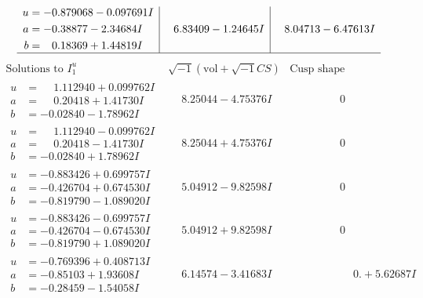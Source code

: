 \documentclass[1p]{elsarticle_modified}
\theoremstyle{definition}
\newcommand{\I}{\sqrt{-1}}
\begin{document}
$$\begin{array}{c|c|c}
\begin{aligned}
u &= -0.879068 - 0.097691 I \\
a &= -0.38877 - 2.34684 I \\
b &= \phantom{-}0.18369 + 1.44819 I\end{aligned}
 & \phantom{-}6.83409 - 1.24645 I & \phantom{-}8.04713 - 6.47613 I\\
 \hline 
 \end{array}$$\newpage$$\begin{array}{c|c|c}  
\text{Solutions to }I^u_{1}& \I (\text{vol} + \sqrt{-1}CS) & \text{Cusp shape}\\
 \hline 
\begin{aligned}
u &= \phantom{-}1.112940 + 0.099762 I \\
a &= \phantom{-}0.20418 + 1.41730 I \\
b &= -0.02840 - 1.78962 I\end{aligned}
 & \phantom{-}8.25044 - 4.75376 I & \phantom{-0.000000 } 0 \\ \hline\begin{aligned}
u &= \phantom{-}1.112940 - 0.099762 I \\
a &= \phantom{-}0.20418 - 1.41730 I \\
b &= -0.02840 + 1.78962 I\end{aligned}
 & \phantom{-}8.25044 + 4.75376 I & \phantom{-0.000000 } 0 \\ \hline\begin{aligned}
u &= -0.883426 + 0.699757 I \\
a &= -0.426704 + 0.674530 I \\
b &= -0.819790 - 1.089020 I\end{aligned}
 & \phantom{-}5.04912 - 9.82598 I & \phantom{-0.000000 } 0 \\ \hline\begin{aligned}
u &= -0.883426 - 0.699757 I \\
a &= -0.426704 - 0.674530 I \\
b &= -0.819790 + 1.089020 I\end{aligned}
 & \phantom{-}5.04912 + 9.82598 I & \phantom{-0.000000 } 0 \\ \hline\begin{aligned}
u &= -0.769396 + 0.408713 I \\
a &= -0.85103 + 1.93608 I \\
b &= -0.28459 - 1.54058 I\end{aligned}
 & \phantom{-}6.14574 - 3.41683 I & \phantom{-0.000000 -}0. + 5.62687 I \\ \hline\begin{aligned}

\end{aligned}
\end{array}$$
\end{document}
